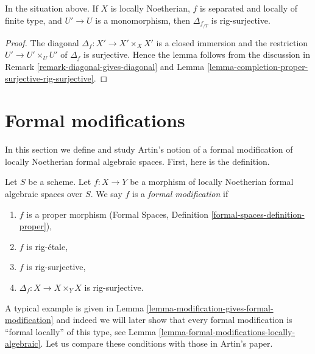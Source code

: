 \begin{lemma}
\label{lemma-separated-mono-open-diagonal-rig-surjective}
In the situation above. If $X$ is locally Noetherian,
$f$ is separated and locally of finite type, and $U' \to U$ is
a monomorphism, then $\Delta_{f_{/T}}$ is rig-surjective.
\end{lemma}

\begin{proof}
The diagonal $\Delta_f : X' \to X' \times_X X'$ is a closed
immersion and the restriction $U' \to U' \times_U U'$ of $\Delta_f$
is surjective. Hence the lemma follows from the discussion in
Remark \ref{remark-diagonal-gives-diagonal} and
Lemma \ref{lemma-completion-proper-surjective-rig-surjective}.
\end{proof}












\section{Formal modifications}
\label{section-formal-modifications}

\noindent
In this section we define and study Artin's notion of a formal modification
of locally Noetherian formal algebraic spaces. First, here is the
definition.

\begin{definition}
\label{definition-formal-modification}
Let $S$ be a scheme. Let $f : X \to Y$ be a morphism of
locally Noetherian formal algebraic spaces over $S$. We say $f$ is a
{\it formal modification} if
\begin{enumerate}
\item $f$ is a proper morphism (Formal Spaces, Definition
\ref{formal-spaces-definition-proper}),
\item $f$ is rig-\'etale,
\item $f$ is rig-surjective,
\item $\Delta_f : X \to X \times_Y X$ is rig-surjective.
\end{enumerate}
\end{definition}

\noindent
A typical example is given in
Lemma \ref{lemma-modification-gives-formal-modification}
and indeed we will later show that every formal modification is
``formal locally'' of this type, see
Lemma \ref{lemma-formal-modifications-locally-algebraic}.
Let us compare these conditions with those in Artin's paper.

